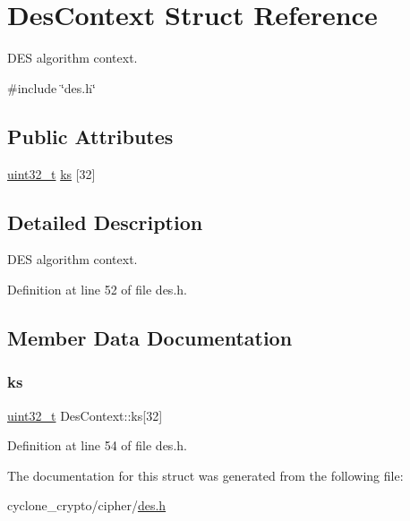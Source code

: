 \hypertarget{structDesContext}{}\section{Des\+Context Struct Reference}
\label{structDesContext}


D\+ES algorithm context.  




{\ttfamily \#include \char`\"{}des.\+h\char`\"{}}

\subsection*{Public Attributes}
\begin{DoxyCompactItemize}
\item 
\hyperlink{stdint_8h_a435d1572bf3f880d55459d9805097f62}{uint32\+\_\+t} \hyperlink{structDesContext_af0d2a0720c948a57d588cc95f8c60a06}{ks} \mbox{[}32\mbox{]}
\end{DoxyCompactItemize}


\subsection{Detailed Description}
D\+ES algorithm context. 

Definition at line 52 of file des.\+h.



\subsection{Member Data Documentation}
\mbox{\label{structDesContext_af0d2a0720c948a57d588cc95f8c60a06}} 
\subsubsection{\texorpdfstring{ks}{ks}}
{\footnotesize\ttfamily \hyperlink{stdint_8h_a435d1572bf3f880d55459d9805097f62}{uint32\+\_\+t} Des\+Context\+::ks\mbox{[}32\mbox{]}}



Definition at line 54 of file des.\+h.



The documentation for this struct was generated from the following file\+:\begin{DoxyCompactItemize}
\item 
cyclone\+\_\+crypto/cipher/\hyperlink{des_8h}{des.\+h}\end{DoxyCompactItemize}
